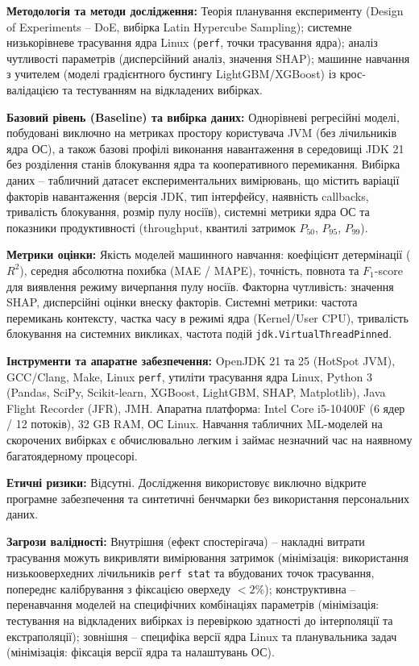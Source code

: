 \textbf{Методологія та методи дослідження:} Теорія планування експерименту (Design of Experiments -- DoE, вибірка Latin Hypercube Sampling); системне низькорівневе трасування ядра Linux (\texttt{perf}, точки трасування ядра); аналіз чутливості параметрів (дисперсійний аналіз, значення SHAP); машинне навчання з учителем (моделі градієнтного бустингу LightGBM/XGBoost) із крос-валідацією та тестуванням на відкладених вибірках.

\textbf{Базовий рівень (Baseline) та вибірка даних:} Однорівневі регресійні моделі, побудовані виключно на метриках простору користувача JVM (без лічильників ядра ОС), а також базові профілі виконання навантаження в середовищі JDK 21 без розділення станів блокування ядра та кооперативного перемикання. Вибірка даних -- табличний датасет експериментальних вимірювань, що містить варіації факторів навантаження (версія JDK, тип інтерфейсу, наявність callbacks, тривалість блокування, розмір пулу носіїв), системні метрики ядра ОС та показники продуктивності (throughput, квантилі затримок $P_{50}$, $P_{95}$, $P_{99}$).

\textbf{Метрики оцінки:} Якість моделей машинного навчання: коефіцієнт детермінації ($R^2$), середня абсолютна похибка (MAE / MAPE), точність, повнота та $F_1$-score для виявлення режиму вичерпання пулу носіїв. Факторна чутливість: значення SHAP, дисперсійні оцінки внеску факторів. Системні метрики: частота перемикань контексту, частка часу в режимі ядра (Kernel/User CPU), тривалість блокування на системних викликах, частота подій \texttt{jdk.VirtualThreadPinned}.

\textbf{Інструменти та апаратне забезпечення:} OpenJDK 21 та 25 (HotSpot JVM), GCC/Clang, Make, Linux \texttt{perf}, утиліти трасування ядра Linux, Python 3 (Pandas, SciPy, Scikit-learn, XGBoost, LightGBM, SHAP, Matplotlib), Java Flight Recorder (JFR), JMH. Апаратна платформа: Intel Core i5-10400F (6 ядер / 12 потоків), 32 GB RAM, ОС Linux. Навчання табличних ML-моделей на скорочених вибірках є обчислювально легким і займає незначний час на наявному багатоядерному процесорі.

\textbf{Етичні ризики:} Відсутні. Дослідження використовує виключно відкрите програмне забезпечення та синтетичні бенчмарки без використання персональних даних.

\textbf{Загрози валідності:} Внутрішня (ефект спостерігача) -- накладні витрати трасування можуть викривляти вимірювання затримок (мінімізація: використання низькооверхедних лічильників \texttt{perf stat} та вбудованих точок трасування, попереднє калібрування з фіксацією оверхеду $<2\%$); конструктивна -- перенавчання моделей на специфічних комбінаціях параметрів (мінімізація: тестування на відкладених вибірках із перевіркою здатності до інтерполяції та екстраполяції); зовнішня -- специфіка версії ядра Linux та планувальника задач (мінімізація: фіксація версії ядра та налаштувань ОС).

